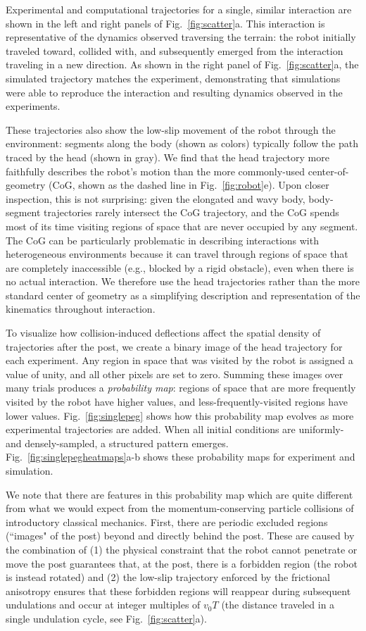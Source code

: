 \documentclass[aps,pre,twocolumn,superscriptaddress]{revtex4-1}
\begin{document}
Experimental and computational trajectories for a single, similar interaction are shown in the left and right panels of Fig.~\ref{fig:scatter}a. This interaction is representative of the dynamics observed traversing the terrain: the robot initially traveled toward, collided with, and subsequently emerged from the interaction traveling in a new direction. As shown in the right panel of Fig.~\ref{fig:scatter}a, the simulated trajectory matches the experiment, demonstrating that simulations were able to reproduce the interaction and resulting dynamics observed in the experiments. 

These trajectories also show the low-slip movement of the robot through the environment: segments along the body (shown as colors) typically follow the path traced by the head (shown in gray). We find that the head trajectory more faithfully describes the robot's motion than the more commonly-used center-of-geometry (CoG, shown as the dashed line in Fig.~\ref{fig:robot}e). Upon closer inspection, this is not surprising: given the elongated and wavy body, body-segment trajectories rarely intersect the CoG trajectory, and the CoG spends most of its time visiting regions of space that are never occupied by any segment. The CoG can be particularly problematic in describing interactions with heterogeneous environments because it can travel through regions of space that are completely inaccessible (e.g., blocked by a rigid obstacle), even when there is no actual interaction. We therefore use the head trajectories rather than the more standard center of geometry as a simplifying description and representation of the kinematics throughout interaction. 

To visualize how collision-induced deflections affect the spatial density of trajectories after the post, we create a binary image of the head trajectory for each experiment. Any region in space that was visited by the robot is assigned a value of unity, and all other pixels are set to zero. Summing these images over many trials produces a \emph{probability map}: regions of space that are more frequently visited by the robot have higher values, and less-frequently-visited regions have lower values. Fig.~\ref{fig:singlepeg} shows how this probability map evolves as more experimental trajectories are added. When all initial conditions are uniformly- and densely-sampled, a structured pattern emerges. Fig.~\ref{fig:singlepegheatmaps}a-b shows these probability maps for experiment and simulation.

We note that there are features in this probability map which are quite different from what we would expect from the momentum-conserving particle collisions of introductory classical mechanics. First, there are periodic excluded regions (``images" of the post) beyond and directly behind the post. These are caused by the combination of (1) the physical constraint that the robot cannot penetrate or move the post guarantees that, at the post, there is a forbidden region (the robot is instead rotated) and (2) the low-slip trajectory enforced by the frictional anisotropy ensures that these forbidden regions will reappear during subsequent undulations and occur at integer multiples of  $v_0T$ (the distance traveled in a single undulation cycle, see Fig.~\ref{fig:scatter}a). 
\end{document}
